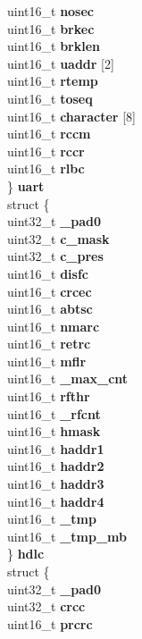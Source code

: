 \begin{DoxyCompactItemize}
\begin{tabbing}
\>\>uint16\_t {\bfseries nosec}\\
\>\>uint16\_t {\bfseries brkec}\\
\>\>uint16\_t {\bfseries brklen}\\
\>\>uint16\_t {\bfseries uaddr} \mbox{[}2\mbox{]}\\
\>\>uint16\_t {\bfseries rtemp}\\
\>\>uint16\_t {\bfseries toseq}\\
\>\>uint16\_t {\bfseries character} \mbox{[}8\mbox{]}\\
\>\>uint16\_t {\bfseries rccm}\\
\>\>uint16\_t {\bfseries rccr}\\
\>\>uint16\_t {\bfseries rlbc}\\
\>\} {\bfseries uart}\\
\>struct \{\\
\>\>uint32\_t {\bfseries \_pad0}\\
\>\>uint32\_t {\bfseries c\_mask}\\
\>\>uint32\_t {\bfseries c\_pres}\\
\>\>uint16\_t {\bfseries disfc}\\
\>\>uint16\_t {\bfseries crcec}\\
\>\>uint16\_t {\bfseries abtsc}\\
\>\>uint16\_t {\bfseries nmarc}\\
\>\>uint16\_t {\bfseries retrc}\\
\>\>uint16\_t {\bfseries mflr}\\
\>\>uint16\_t {\bfseries \_max\_cnt}\\
\>\>uint16\_t {\bfseries rfthr}\\
\>\>uint16\_t {\bfseries \_rfcnt}\\
\>\>uint16\_t {\bfseries hmask}\\
\>\>uint16\_t {\bfseries haddr1}\\
\>\>uint16\_t {\bfseries haddr2}\\
\>\>uint16\_t {\bfseries haddr3}\\
\>\>uint16\_t {\bfseries haddr4}\\
\>\>uint16\_t {\bfseries \_tmp}\\
\>\>uint16\_t {\bfseries \_tmp\_mb}\\
\>\} {\bfseries hdlc}\\
\>struct \{\\
\>\>uint32\_t {\bfseries \_pad0}\\
\>\>uint32\_t {\bfseries crcc}\\
\>\>uint16\_t {\bfseries prcrc}\\

\end{tabbing}
\end{DoxyCompactItemize}
